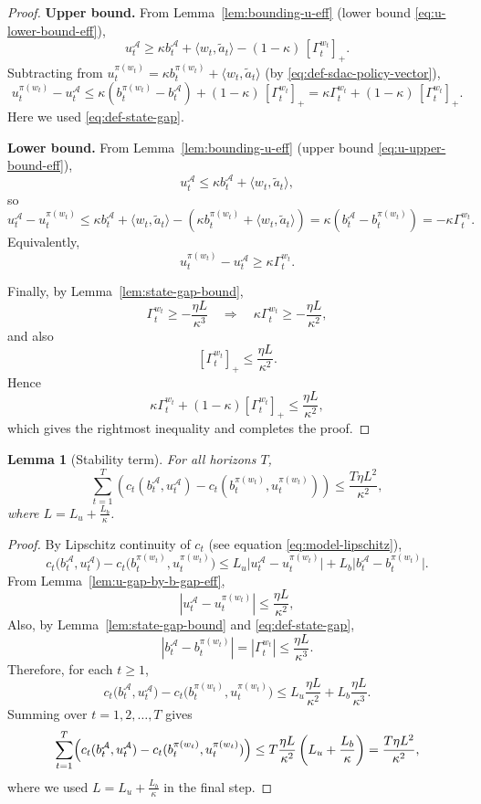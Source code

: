 \documentclass[11pt]{article}
\newtheorem{lemma}{Lemma}
\begin{document}
\begin{proof}
\textbf{Upper bound.}
From Lemma~\ref{lem:bounding-u-eff} (lower bound \eqref{eq:u-lower-bound-eff}),
\[
u_t^{\mathcal A}
\ge
\kappa b_t^{\mathcal A} + \langle w_t,\widetilde a_t\rangle
-(1-\kappa)\,[\Gamma_t^{w_t}]_+ .
\]
Subtracting from \(u_t^{\pi(w_t)} = \kappa b_t^{\pi(w_t)} + \langle w_t,\widetilde a_t\rangle\) (by \eqref{eq:def-sdac-policy-vector}),
\[
u_t^{\pi(w_t)} - u_t^{\mathcal A}
\le
\kappa (b_t^{\pi(w_t)}-b_t^{\mathcal A})
+(1-\kappa)\,[\Gamma_t^{w_t}]_+
= \kappa \Gamma_t^{w_t} + (1-\kappa)\,[\Gamma_t^{w_t}]_+ .
\]
Here we used \eqref{eq:def-state-gap}.

\textbf{Lower bound.}
From Lemma~\ref{lem:bounding-u-eff} (upper bound \eqref{eq:u-upper-bound-eff}),
\[
u_t^{\mathcal A}
\le
\kappa b_t^{\mathcal A} + \langle w_t,\widetilde a_t\rangle ,
\]
so
\[
u_t^{\mathcal A} - u_t^{\pi(w_t)}
\le
\kappa b_t^{\mathcal A} + \langle w_t,\widetilde a_t\rangle
- (\kappa b_t^{\pi(w_t)} + \langle w_t,\widetilde a_t\rangle)
= \kappa(b_t^{\mathcal A}-b_t^{\pi(w_t)})
= -\kappa\Gamma_t^{w_t}.
\]
Equivalently,
\[
u_t^{\pi(w_t)} - u_t^{\mathcal A}
\ge \kappa \Gamma_t^{w_t}.
\]

Finally, by Lemma~\ref{lem:state-gap-bound},
\[
\Gamma_t^{w_t} \ge -\frac{\eta L}{\kappa^3}
\quad\Longrightarrow\quad
\kappa\Gamma_t^{w_t} \ge -\frac{\eta L}{\kappa^2},
\]
and also
\[
[\Gamma_t^{w_t}]_+ \le \frac{\eta L}{\kappa^2}.
\]
Hence
\[
\kappa\Gamma_t^{w_t} + (1-\kappa)[\Gamma_t^{w_t}]_+
\le
\frac{\eta L}{\kappa^2},
\]
which gives the rightmost inequality and completes the proof.
\end{proof}

\begin{lemma}[Stability term]
\label{lem:stab-sum}
For all horizons \(T\),
\[
\sum_{t=1}^T \left(c_t(b_t^{\mathcal A},u_t^{\mathcal A})-c_t\left(b_t^{\pi(w_t)},u_t^{\pi(w_t)}\right)\right)
\le
\frac{T\eta L^2}{\kappa^2},
\]
where \(L=L_u+\tfrac{L_b}{\kappa}\).
\end{lemma}

\begin{proof}
By Lipschitz continuity of \(c_t\) (see equation \eqref{eq:model-lipschitz}),
\[
c_t\bigl(b_t^{\mathcal A},u_t^{\mathcal A}\bigr)
-
c_t\bigl(b_t^{\pi(w_t)},u_t^{\pi(w_t)}\bigr) 
\le
L_u \big|u_t^{\mathcal A} - u_t^{\pi(w_t)}\big|
+ L_b \big|b_t^{\mathcal A} - b_t^{\pi(w_t)}\big|.
\]
From Lemma~\ref{lem:u-gap-by-b-gap-eff},
\[
|u_t^{\mathcal A} - u_t^{\pi(w_t)}|
\le \frac{\eta L}{\kappa^2},
\]
Also, by Lemma~\ref{lem:state-gap-bound} and \eqref{eq:def-state-gap},
\[
|b_t^{\mathcal A} - b_t^{\pi(w_t)}|
= |\Gamma_t^{w_t}|
\le \frac{\eta L}{\kappa^3}.
\]
Therefore, for each \(t \ge 1\),
\[
c_t\bigl(b_t^{\mathcal A},u_t^{\mathcal A}\bigr)
-
c_t\bigl(b_t^{\pi(w_t)},u_t^{\pi(w_t)}\bigr)
\le
L_u \frac{\eta L}{\kappa^2}
+ L_b \frac{\eta L}{\kappa^3}.
\]
Summing over \(t=1,2,\dots,T\) gives
\[
\sum_{t=1}^T
\Bigl(
c_t(b_t^{\mathcal A},u_t^{\mathcal A})
-
c_t(b_t^{\pi(w_t)},u_t^{\pi(w_t)})
\Bigr)
\le
T\frac{\eta L}{\kappa^2}\left(
L_u 
+  \frac{L_b}{\kappa}
\right)
=
\frac{T\eta L^2}{\kappa^2},
\]
where we used \(L = L_u + \tfrac{L_b}{\kappa}\) in the final step.
\end{proof}
\end{document}
